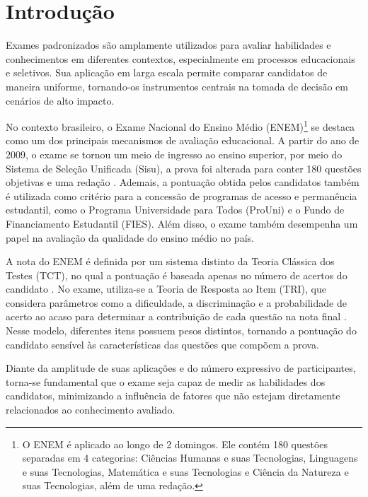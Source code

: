 \documentclass[a4paper,10pt, twocolumn]{article}
\begin{document}
\section{Introdução}

Exames padronizados são amplamente utilizados para avaliar habilidades e conhecimentos em diferentes contextos, especialmente em processos educacionais e seletivos. Sua aplicação em larga escala permite comparar candidatos de maneira uniforme, tornando-os instrumentos centrais na tomada de decisão em cenários de alto impacto.

No contexto brasileiro, o Exame Nacional do Ensino Médio (ENEM)\footnote{O ENEM é aplicado ao longo de 2 domingos. Ele contém 180 questões separadas em 4 categorias: Ciências Humanas e suas Tecnologias, Linguagens e suas Tecnologias, Matemática e suas Tecnologias e Ciência da Natureza e suas Tecnologias, além de uma redação.} se destaca como um dos principais mecanismos de avaliação educacional. A partir do ano de 2009, o exame se tornou um meio de ingresso ao ensino superior, por meio do Sistema de Seleção Unificada (Sisu), a prova foi alterada para conter 180 questões objetivas e uma redação \cite{Inep_2020}. Ademais, a pontuação obtida pelos candidatos também é utilizada como critério para a concessão de programas de acesso e permanência estudantil, como o Programa Universidade para Todos (ProUni) e o Fundo de Financiamento Estudantil (FIES). Além disso, o exame também desempenha um papel na avaliação da qualidade do ensino médio no país.

A nota do ENEM é definida por um sistema distinto da Teoria Clássica dos Testes (TCT), no qual a pontuação é baseada apenas no número de acertos do candidato \cite{sousa_teoria_2020}. No exame, utiliza-se a Teoria de Resposta ao Item (TRI), que considera parâmetros como a dificuldade, a discriminação e a probabilidade de acerto ao acaso para determinar a contribuição de cada questão na nota final \cite{inep2021enem}. Nesse modelo, diferentes itens possuem pesos distintos, tornando a pontuação do candidato sensível às características das questões que compõem a prova. 

Diante da amplitude de suas aplicações e do número expressivo de participantes, torna-se fundamental que o exame seja capaz de medir as habilidades dos candidatos, minimizando a influência de fatores que não estejam diretamente relacionados ao conhecimento avaliado.
\end{document}
